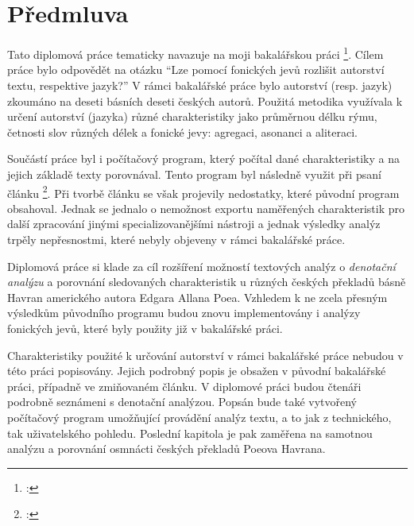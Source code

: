 \documentclass[dp.tex]{subfiles}
\begin{document}
\chapter*{Předmluva}
\label{chap:predmluva} 

Tato diplomová práce tematicky navazuje na moji bakalářskou práci \footnote{\cite{Slahora2012}: }. Cílem práce bylo odpovědět na otázku \enquote{Lze pomocí fonických jevů rozlišit autorství textu, respektive jazyk?} V rámci bakalářské práce bylo autorství (resp. jazyk) zkoumáno na deseti básních deseti českých autorů. Použitá metodika využívala k určení autorství (jazyka) různé charakteristiky jako průměrnou délku rýmu, četnosti slov různých délek a fonické jevy: agregaci, asonanci a aliteraci.

Součástí práce byl i počítačový program, který počítal dané charakteristiky a na jejich základě texty porovnával. Tento program byl následně využit při psaní článku \footnote{\cite{Marek2013}: }. Při tvorbě článku se však projevily nedostatky, které původní program obsahoval. Jednak se jednalo o nemožnost exportu naměřených charakteristik pro další zpracování jinými specializovanějšími nástroji a jednak výsledky analýz trpěly nepřesnostmi, které nebyly objeveny v rámci bakalářské práce.

Diplomová práce si klade za cíl rozšíření možností textových analýz o \textit{denotační analýzu} a porovnání sledovaných charakteristik u různých českých překladů básně Havran amerického autora Edgara Allana Poea. Vzhledem k ne zcela přesným výsledkům původního programu budou znovu implementovány i analýzy fonických jevů, které byly použity již v bakalářské práci.

Charakteristiky použité k určování autorství v rámci bakalářské práce nebudou v této práci popisovány. Jejich podrobný popis je obsažen v původní bakalářské práci, případně ve zmiňovaném článku. V diplomové práci budou čtenáři podrobně seznámeni s denotační analýzou. Popsán bude také vytvořený počítačový program umožňující provádění analýz textu, a to jak z technického, tak uživatelského pohledu. Poslední kapitola je pak zaměřena na samotnou analýzu a porovnání osmnácti českých překladů Poeova Havrana.
\end{document}
